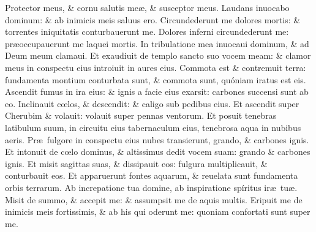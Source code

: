 \documentclass[a5paper,10pt]{book}
\def\ae{æ}
\def\oe{œ}
\begin{document}
\begin{multicols*}{2}
\newline \color{red} P\color{black}rotector meus, \& cornu salutis me\ae , \& susceptor meus.
\newline \color{red} L\color{black}audans inuocabo dominum: \& ab inimicis meis saluus ero.
\newline \color{red} C\color{black}ircundederunt me dolores mortis: \& torrentes iniquitatis conturbauerunt me.
\newline \color{red} D\color{black}olores inferni circundederunt me: pr\ae occupauerunt me laquei mortis.
\newline \color{red} I\color{black}n tribulatione mea inuocaui dominum, \& ad Deum meum clamaui.
\newline \color{red} E\color{black}t exaudiuit de templo sancto suo vocem meam: \& clamor meus in conspectu eius introiuit in aures eius.
\newline \color{red} C\color{black}ommota est \& contremuit terra: fundamenta montium conturbata sunt, \& commota sunt, quóniam iratus est eis.
\newline \color{red} A\color{black}scendit fumus in ira eius: \& ignis a facie eius exarsit: carbones succensi sunt ab eo.
\newline \color{red} I\color{black}nclinauit c\oe los, \& descendit: \& caligo sub pedibus eius.
\newline \color{red} E\color{black}t ascendit super Cherubim \& volauit: volauit super pennas ventorum.
\newline \color{red} E\color{black}t posuit tenebras latibulum suum, in circuitu eius tabernaculum eius, tenebrosa aqua in nubibus aeris.
\newline \color{red} P\color{black}r\ae \ fulgore in conspectu eius nubes transierunt, grando, \& carbones ignis.
\newline \color{red} E\color{black}t intonuit de c\oe lo dominus, \& altissimus dedit vocem suam: grando \& carbones ignis.
\newline \color{red} E\color{black}t misit sagittas suas, \& dissipauit eos: fulgura multiplicauit, \& conturbauit eos.
\newline \color{red} E\color{black}t apparuerunt fontes aquarum, \& reuelata sunt fundamenta orbis terrarum.
\newline \color{red} A\color{black}b increpatione tua domine, ab inspiratione spíritus ir\ae \ tu\ae .
\newline \color{red} M\color{black}isit de summo, \& accepit me: \& assumpsit me de aquis multis.
\newline \color{red} E\color{black}ripuit me de inimicis meis fortissimis, \& ab his qui oderunt me: quoniam confortati sunt super me.

\end{multicols*}
\end{document}

